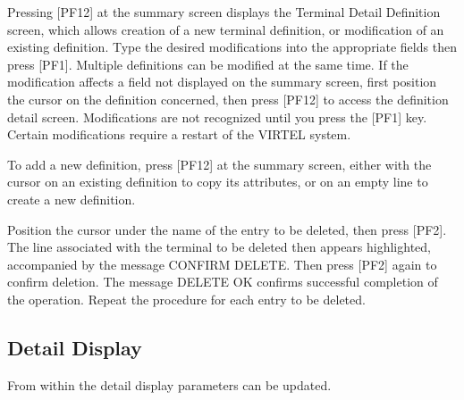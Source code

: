 \documentclass[letterpaper,10pt,english]{sphinxmanual}
\begin{document}
\sphinxAtStartPar
{} \sphinxhyphen{} Pressing {[}PF12{]} at the summary screen displays the Terminal Detail Definition screen, which allows creation of a new terminal definition, or modification of an existing definition. Type the desired modifications into the appropriate fields then press {[}PF1{]}. Multiple definitions can be modified at the same time. If the modification affects a field not displayed on the summary screen, first position the cursor on the definition concerned, then press {[}PF12{]} to access the definition detail screen. Modifications are not recognized until you press the {[}PF1{]} key. Certain modifications require a restart of the VIRTEL
system.

\sphinxAtStartPar
{} \sphinxhyphen{} To add a new definition, press {[}PF12{]} at the summary screen, either with the cursor on an existing definition to copy its attributes, or on an empty line to create a new definition.

\sphinxAtStartPar
{} \sphinxhyphen{} Position the cursor under the name of the entry to be deleted, then press {[}PF2{]}. The line associated with the terminal to be deleted then appears highlighted, accompanied by the message CONFIRM DELETE. Then press {[}PF2{]} again to confirm deletion. The message DELETE OK confirms successful completion of the operation. Repeat the procedure for each entry to be deleted.

\ignorespaces 

\subsection{Detail Display}
\label{\detokenize{connectivity_guide:index-99}}\label{\detokenize{connectivity_guide:id52}}
\sphinxAtStartPar
{}

\sphinxAtStartPar
From within the detail display parameters can be updated.

\ignorespaces 
\end{document}
